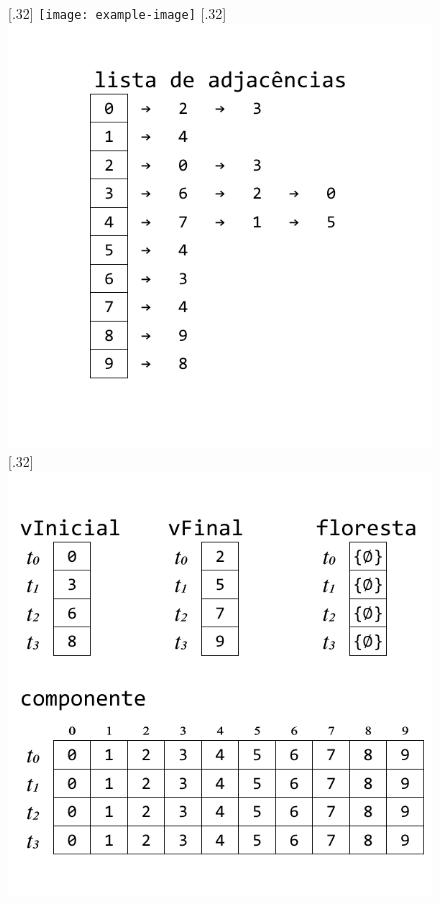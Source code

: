 \documentclass[12pt]{article}
\begin{document}
\begin{figure}
	\centering
	\subcaptionbox{}[.32\textwidth]
	{
		\texttt{[image: example-image]}
	}
	\subcaptionbox{}[.32\textwidth]
	{
		\includegraphics[width=\linewidth]{B.pdf}
	}
	\subcaptionbox{}[.32\textwidth]
	{
		\includegraphics[width=\linewidth]{C.pdf}
}
\end{figure}
\end{document}

